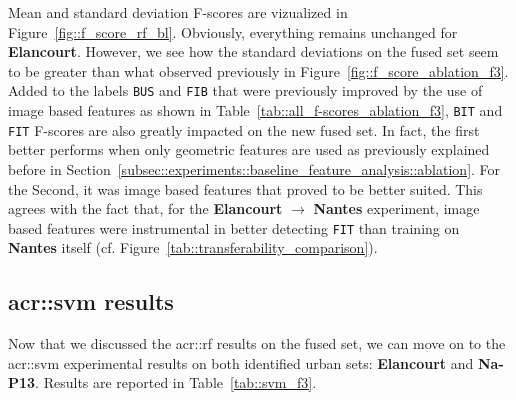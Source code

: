         Mean and standard deviation F-scores are vizualized in Figure~\ref{fig::f_score_rf_bl}.
        Obviously, everything remains unchanged for \textbf{Elancourt}.
        However, we see how the standard deviations on the fused set seem to be greater than what observed previously in Figure~\ref{fig::f_score_ablation_f3}.
        Added to the labels \texttt{BUS} and \texttt{FIB} that were previously improved by the use of image based features as shown in Table~\ref{tab::all_f-scores_ablation_f3}, \texttt{BIT} and \texttt{FIT} F-scores are also greatly impacted on the new fused set.
        In fact, the first better performs when only geometric features are used as previously explained before in Section~\ref{subsec::experiments::baseline_feature_analysis::ablation}.
        For the Second, it was image based features that proved to be better suited.
        This agrees with the fact that, for the \textbf{Elancourt} \(\rightarrow\) \textbf{Nantes} experiment, image based features were instrumental in better detecting \texttt{FIT} than training on \textbf{Nantes} itself (cf. Figure~\ref{tab::transferability_comparison}).
        
    \subsection{\texorpdfstring{\acrshort*{acr::svm}}{SVM} results}
        \label{subsec::more_experiments::classifier::svm}
        Now that we discussed the \gls{acr::rf} results on the fused set, we can move on to the \gls{acr::svm} experimental results on both identified urban sets: \textbf{Elancourt} and \textbf{Na-P13}.
        Results are reported in Table~\ref{tab::svm_f3}.\\

